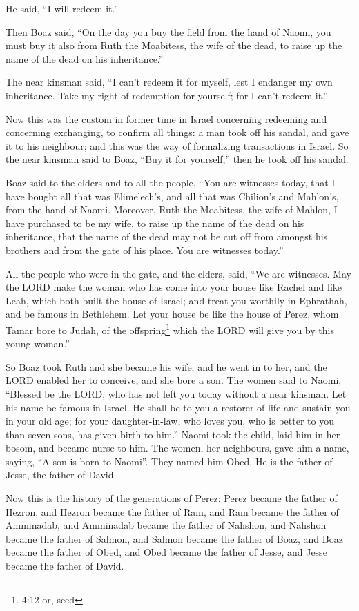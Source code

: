 He said, ``I will redeem it.''

 Then Boaz said, ``On the day you buy the field from the
hand of Naomi, you must buy it also from Ruth the Moabitess, the wife of
the dead, to raise up the name of the dead on his inheritance.''

 The near kinsman said, ``I can't redeem it for myself, lest
I endanger my own inheritance. Take my right of redemption for yourself;
for I can't redeem it.''

 Now this was the custom in former time in Israel concerning
redeeming and concerning exchanging, to confirm all things: a man took
off his sandal, and gave it to his neighbour; and this was the way of
formalizing transactions in Israel.  So the near kinsman
said to Boaz, ``Buy it for yourself,'' then he took off his sandal.

 Boaz said to the elders and to all the people, ``You are
witnesses today, that I have bought all that was Elimelech's, and all
that was Chilion's and Mahlon's, from the hand of Naomi. 
Moreover, Ruth the Moabitess, the wife of Mahlon, I have purchased to be
my wife, to raise up the name of the dead on his inheritance, that the
name of the dead may not be cut off from amongst his brothers and from
the gate of his place. You are witnesses today.''

 All the people who were in the gate, and the elders, said,
``We are witnesses. May the LORD make the woman who has come into your
house like Rachel and like Leah, which both built the house of Israel;
and treat you worthily in Ephrathah, and be famous in Bethlehem.
 Let your house be like the house of Perez, whom Tamar bore
to Judah, of the offspring\footnote{4:12 or, seed} which the LORD will
give you by this young woman.''

 So Boaz took Ruth and she became his wife; and he went in
to her, and the LORD enabled her to conceive, and she bore a son.
 The women said to Naomi, ``Blessed be the LORD, who has
not left you today without a near kinsman. Let his name be famous in
Israel.  He shall be to you a restorer of life and sustain
you in your old age; for your daughter-in-law, who loves you, who is
better to you than seven sons, has given birth to him.'' 
Naomi took the child, laid him in her bosom, and became nurse to him.
 The women, her neighbours, gave him a name, saying, ``A
son is born to Naomi''. They named him Obed. He is the father of Jesse,
the father of David.

 Now this is the history of the generations of Perez: Perez
became the father of Hezron,  and Hezron became the father
of Ram, and Ram became the father of Amminadab,  and
Amminadab became the father of Nahshon, and Nahshon became the father of
Salmon,  and Salmon became the father of Boaz, and Boaz
became the father of Obed,  and Obed became the father of
Jesse, and Jesse became the father of David.
